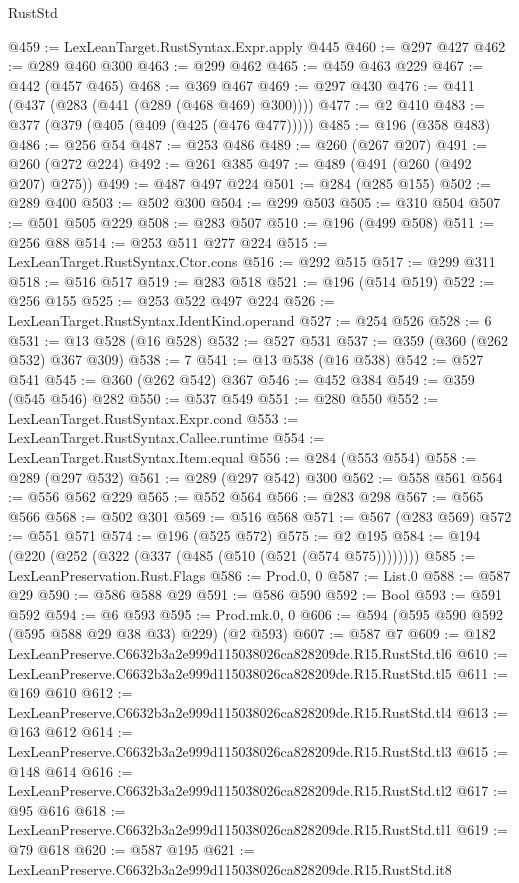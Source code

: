 \begin{lexlean}{RustStd}
\begin{coremodule}
@459 := LexLeanTarget.RustSyntax.Expr.apply @445
@460 := @297 @427
@462 := @289 @460 @300
@463 := @299 @462
@465 := @459 @463 @229
@467 := @442 (@457 @465)
@468 := @369 @467
@469 := @297 @430
@476 := @411 (@437 (@283 (@441 (@289 (@468 @469) @300))))
@477 := @2 @410
@483 := @377 (@379 (@405 (@409 (@425 (@476 @477)))))
@485 := @196 (@358 @483)
@486 := @256 @54
@487 := @253 @486
@489 := @260 (@267 @207)
@491 := @260 (@272 @224)
@492 := @261 @385
@497 := @489 (@491 (@260 (@492 @207) @275))
@499 := @487 @497 @224
@501 := @284 (@285 @155)
@502 := @289 @400
@503 := @502 @300
@504 := @299 @503
@505 := @310 @504
@507 := @501 @505 @229
@508 := @283 @507
@510 := @196 (@499 @508)
@511 := @256 @88
@514 := @253 @511 @277 @224
@515 := LexLeanTarget.RustSyntax.Ctor.cons
@516 := @292 @515
@517 := @299 @311
@518 := @516 @517
@519 := @283 @518
@521 := @196 (@514 @519)
@522 := @256 @155
@525 := @253 @522 @497 @224
@526 := LexLeanTarget.RustSyntax.IdentKind.operand
@527 := @254 @526
@528 := 6
@531 := @13 @528 (@16 @528)
@532 := @527 @531
@537 := @359 (@360 (@262 @532) @367 @309)
@538 := 7
@541 := @13 @538 (@16 @538)
@542 := @527 @541
@545 := @360 (@262 @542) @367
@546 := @452 @384
@549 := @359 (@545 @546) @282
@550 := @537 @549
@551 := @280 @550
@552 := LexLeanTarget.RustSyntax.Expr.cond
@553 := LexLeanTarget.RustSyntax.Callee.runtime
@554 := LexLeanTarget.RustSyntax.Item.equal
@556 := @284 (@553 @554)
@558 := @289 (@297 @532)
@561 := @289 (@297 @542) @300
@562 := @558 @561
@564 := @556 @562 @229
@565 := @552 @564
@566 := @283 @298
@567 := @565 @566
@568 := @502 @301
@569 := @516 @568
@571 := @567 (@283 @569)
@572 := @551 @571
@574 := @196 (@525 @572)
@575 := @2 @195
@584 := @194 (@220 (@252 (@322 (@337 (@485 (@510 (@521 (@574 @575))))))))
@585 := LexLeanPreservation.Rust.Flags
@586 := Prod.{0, 0}
@587 := List.{0}
@588 := @587 @29
@590 := @586 @588 @29
@591 := @586 @590
@592 := Bool
@593 := @591 @592
@594 := @6 @593
@595 := Prod.mk.{0, 0}
@606 := @594 (@595 @590 @592 (@595 @588 @29 @38 @33) @229) (@2 @593)
@607 := @587 @7
@609 := @182 LexLeanPreserve.C6632b3a2e999d115038026ca828209de.R15.RustStd.tl6
@610 := LexLeanPreserve.C6632b3a2e999d115038026ca828209de.R15.RustStd.tl5
@611 := @169 @610
@612 := LexLeanPreserve.C6632b3a2e999d115038026ca828209de.R15.RustStd.tl4
@613 := @163 @612
@614 := LexLeanPreserve.C6632b3a2e999d115038026ca828209de.R15.RustStd.tl3
@615 := @148 @614
@616 := LexLeanPreserve.C6632b3a2e999d115038026ca828209de.R15.RustStd.tl2
@617 := @95 @616
@618 := LexLeanPreserve.C6632b3a2e999d115038026ca828209de.R15.RustStd.tl1
@619 := @79 @618
@620 := @587 @195
@621 := LexLeanPreserve.C6632b3a2e999d115038026ca828209de.R15.RustStd.it8

\end{coremodule}
\end{lexlean}
